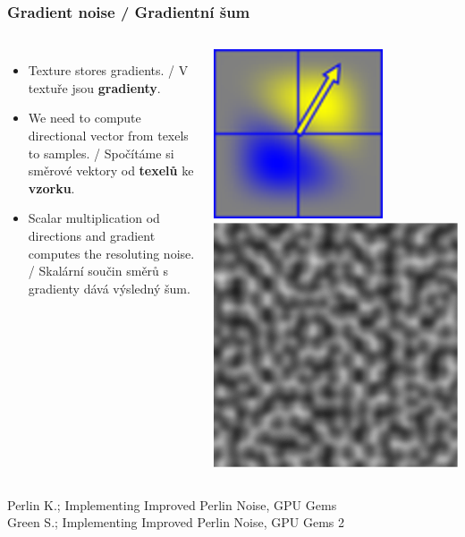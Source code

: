 \begin{frame}[fragile]\frametitle{Gradient noise / Gradientní šum}\scriptsize
\begin{columns}[c]
  \begin{itemize}
      \item Texture stores gradients. / V textuře jsou \textbf{gradienty}.
      \item We need to compute directional vector from texels to samples. / Spočítáme si směrové vektory od \textbf{texelů} ke \textbf{vzorku}.
      \item Scalar multiplication od directions and gradient computes the resoluting noise. / Skalární součin směrů s gradienty dává výsledný šum.
  \end{itemize}
  \includegraphics[width=.5\textwidth]{pics/procedural/grad_noise.eps}
  \includegraphics[width=.5\textwidth]{pics/procedural/perlin_noise.eps}
\end{columns}
Perlin K.; Implementing Improved Perlin Noise, GPU Gems\\
Green S.; Implementing Improved Perlin Noise, GPU Gems 2
\end{frame}

